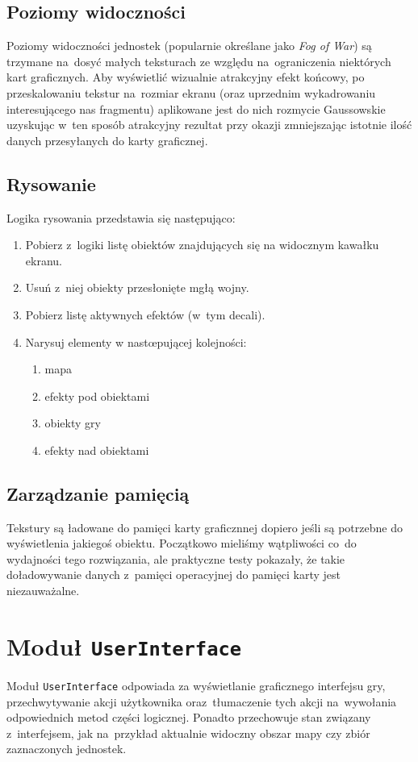 \documentclass[licencjacka]{pracamgr}
\begin{document}
    \subsection{Poziomy widoczności}
      Poziomy widoczności jednostek (popularnie określane jako \emph{Fog of War}) są trzymane na~dosyć małych teksturach ze
      względu na~ograniczenia niektórych kart graficznych. Aby wyświetlić wizualnie atrakcyjny efekt końcowy, po
      przeskalowaniu tekstur na~rozmiar ekranu (oraz uprzednim wykadrowaniu interesującego nas fragmentu) aplikowane jest
      do nich rozmycie Gaussowskie\cite{GB} uzyskując w~ten sposób atrakcyjny rezultat przy okazji zmniejszając istotnie
      ilość danych przesyłanych do karty graficznej.

    \subsection{Rysowanie}
      Logika rysowania przedstawia się następująco:
      \begin{enumerate}
        \item Pobierz z~logiki listę obiektów znajdujących się na widocznym kawałku ekranu.
        \item Usuń z~niej obiekty przesłonięte mgłą wojny.
        \item Pobierz listę aktywnych efektów (w~tym decali).
        \item Narysuj elementy w nastœpującej kolejności:
          \begin{enumerate}
            \item mapa
            \item efekty pod obiektami
            \item obiekty gry
            \item efekty nad obiektami
          \end{enumerate}
      \end{enumerate}

    \subsection{Zarządzanie pamięcią}
      Tekstury są ładowane do pamięci karty graficznnej dopiero jeśli są potrzebne do wyświetlenia jakiegoś obiektu.
      Początkowo mieliśmy wątpliwości co~do wydajności tego rozwiązania, ale praktyczne testy pokazały, że takie
      doładowywanie danych z~pamięci operacyjnej do pamięci karty jest niezauważalne.

  \section{Moduł \texttt{UserInterface}}
    Moduł \texttt{UserInterface} odpowiada za wyświetlanie graficznego interfejsu gry, przechwytywanie akcji użytkownika
    oraz~tłumaczenie tych akcji na~wywołania odpowiednich metod części logicznej. Ponadto przechowuje stan związany
    z~interfejsem, jak na~przykład aktualnie widoczny obszar mapy czy zbiór zaznaczonych jednostek.
\end{document}
